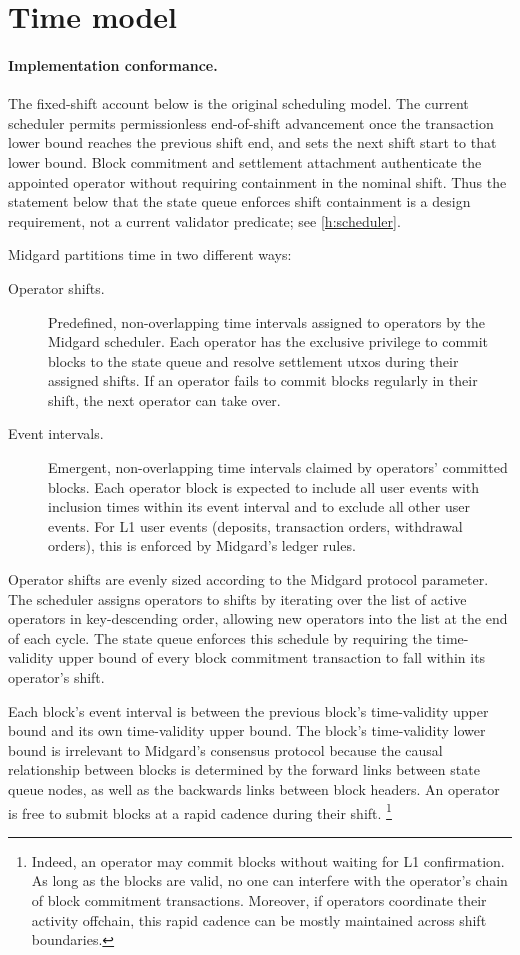 \documentclass[../midgard.tex]{subfiles}
\begin{document}
\section{Time model}
\label{h:time-model}

\paragraph{Implementation conformance.} The fixed-shift account below is the original scheduling model. The current scheduler permits permissionless end-of-shift advancement once the transaction lower bound reaches the previous shift end, and sets the next shift start to that lower bound. Block commitment and settlement attachment authenticate the appointed operator without requiring containment in the nominal shift. Thus the statement below that the state queue enforces shift containment is a design requirement, not a current validator predicate; see \cref{h:scheduler}.

Midgard partitions time in two different ways:
\begin{description}
    \item[Operator shifts.] Predefined, non-overlapping time intervals assigned to operators by the Midgard scheduler.
      Each operator has the exclusive privilege to commit blocks to the state queue and resolve settlement utxos during their assigned shifts.
      If an operator fails to commit blocks regularly in their shift, the next operator can take over.
    \item[Event intervals.] Emergent, non-overlapping time intervals claimed by operators' committed blocks.
      Each operator block is expected to include all user events with inclusion times within its event interval and to exclude all other user events.
      For L1 user events (deposits, transaction orders, withdrawal orders), this is enforced by Midgard's ledger rules.
\end{description}

Operator shifts are evenly sized according to the  Midgard protocol parameter.
The scheduler assigns operators to shifts by iterating over the list of active operators in key-descending order, allowing new operators into the list at the end of each cycle.
The state queue enforces this schedule by requiring the time-validity upper bound of every block commitment transaction to fall within its operator's shift.

Each block's event interval is between the previous block's time-validity upper bound and its own time-validity upper bound.
The block's time-validity lower bound is irrelevant to Midgard's consensus protocol because the causal relationship between blocks is determined by the forward links between state queue nodes, as well as the backwards links between block headers.
An operator is free to submit blocks at a rapid cadence during their shift.%
\footnote{Indeed, an operator may commit blocks without waiting for L1 confirmation.
As long as the blocks are valid, no one can interfere with the operator's chain of block commitment transactions.
Moreover, if operators coordinate their activity offchain, this rapid cadence can be mostly maintained across shift boundaries.}
\end{document}
